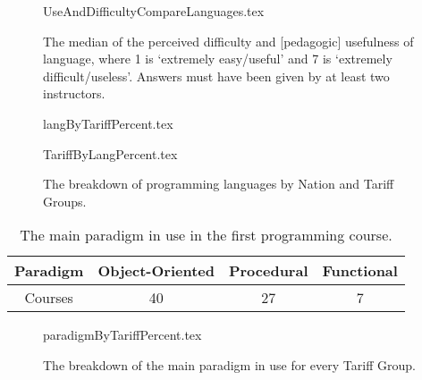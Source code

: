 \documentclass{sig-alternate}
\begin{document}
\begin{figure}
\begin{center}
{UseAndDifficultyCompareLanguages.tex}
\end{center}\vskip-18pt
\caption{The median of the perceived difficulty and [pedagogic] usefulness of language, where 1 is `extremely easy/useful' and 7 is `extremely difficult/useless'.  Answers must have been given by at least two instructors.\label{fig:utility}}
\end{figure}

\begin{figure}
\begin{center}
{langByTariffPercent.tex}
\end{center}
%
\begin{center}
{TariffByLangPercent.tex}
\end{center}
\caption{The breakdown of programming languages by Nation and Tariff Groups.\label{fig;LangTariff}}
\end{figure}

\begin{table}[]
\centering
\caption{The main paradigm in use in the first programming course.}
\label{tab:paradigm}
\begin{tabular}{cccc}
\hline
Paradigm & Object-Oriented & Procedural & Functional \\ \hline
Courses  & 40              & 27         & 7          \\ \hline
\end{tabular}
\end{table}


\begin{figure}
\begin{center}
{paradigmByTariffPercent.tex}
\end{center}
\caption{The breakdown of the main paradigm in use for every Tariff Group.}
\end{figure}
\end{document}
